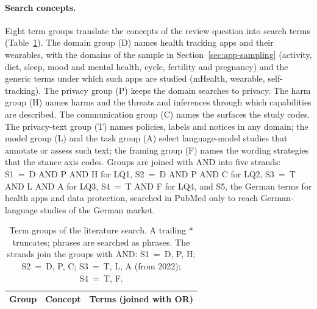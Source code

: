 \paragraph{Search concepts.} Eight term groups translate the concepts of the
review question into search terms (Table~\ref{tab:lit-groups}). The domain group
(D) names health tracking apps and their wearables, with the domains of the
sample in Section~\ref{sec:app-sampling} (activity, diet, sleep, mood and
mental health, cycle, fertility and pregnancy) and the generic terms under which
such apps are studied (mHealth, wearable, self-tracking). The privacy group (P)
keeps the domain searches to privacy. The harm group (H) names harms and the
threats and inferences through which capabilities are described. The
communication group (C) names the surfaces the study codes. The privacy-text
group (T) names policies, labels and notices in any domain; the model group (L)
and the task group (A) select language-model studies that annotate or assess
such text; the framing group (F) names the wording strategies that the stance
axis codes. Groups are joined with AND into five strands: S1~=~D AND P AND H
for LQ1, S2~=~D AND P AND C for LQ2, S3~=~T AND L AND A for LQ3, S4~=~T AND F
for LQ4, and S5, the German terms for health apps and data protection, searched
in PubMed only to reach German-language studies of the German market.

\begin{table}[tbp]
\centering
\begin{singlespace}
\caption[Term groups of the literature search]{Term groups of the literature
search. A trailing * truncates; phrases are searched as phrases. The strands join
the groups with AND: S1~=~D, P, H; S2~=~D, P, C; S3~=~T, L, A (from 2022);
S4~=~T, F.}
\label{tab:lit-groups}
\small
\begin{tabularx}{\textwidth}{@{}l>{\raggedright\arraybackslash}p{3.3cm}>{\raggedright\arraybackslash}X@{}}
\toprule
\textbf{Group} & \textbf{Concept} & \textbf{Terms (joined with OR)} \\
\midrule
\end{tabularx}
\end{singlespace}
\end{table}

